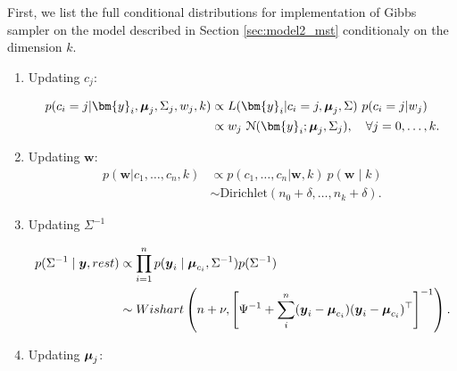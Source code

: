 First, we list the full conditional distributions for implementation of Gibbs sampler on the model described in Section \ref{sec:model2_mst} conditionaly on the dimension $k$.

\begin{enumerate}

\item Updating $c_j$:

\begin{align*}
p (c_i = j | \bm{y}_i, \bfmu_j, \Sigma_j, w_j, k) &\propto L(\bm{y}_i | c_i = j, \bfmu_j, \Sigma) \ p(c_i = j | w_j)
\\
&\propto w_j \ \mathcal{N} (\bm{y}_i; \bfmu_{j}, \Sigma_j), \quad \forall j = 0, \dots, k.
\end{align*}

\item Updating $\bm{w}$:
\begin{align*}
p(\bm{w} | c_1, \dots, c_n, k) &\propto p(c_1, \dots, c_n | \bm{w}, k) \ p(\bm{w} \mid k)
\\
&\sim \mbox{Dirichlet} (n_0 + \delta, \dots, n_k + \delta).
\end{align*}



\item Updating $\Sigma^{-1}$

\begin{align*}
p(\Sigma^{-1} \mid \mbox{\boldmath $y$}, rest) &\propto \prod^n_{i=1} p(\mbox{\boldmath $y$}_i \mid \mbox{\boldmath $\mu$}_{c_i}, \Sigma^{-1})p(\Sigma^{-1})\\
&\sim Wishart \left( n + \nu, \left[ \Psi^{-1} + \sum^{n}_{i}(\mbox{\boldmath $y$}_i - \mbox{\boldmath $\mu$}_{c_i})(\mbox{\boldmath $y$}_i - \mbox{\boldmath $\mu$}_{c_i})^{\top} \right]^{-1}\right).
\end{align*}

\item Updating $\mbox{\boldmath $\mu$}_j$:


\end{enumerate}

